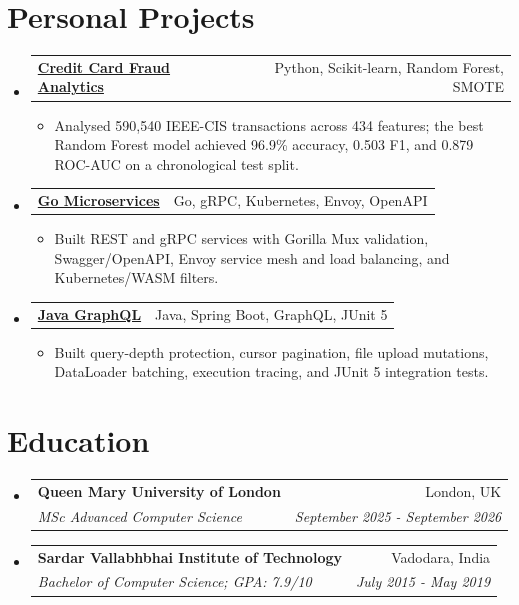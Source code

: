 \documentclass[a4paper,10pt]{article}
\makeatletter
\newcommand{\resumeItem}[1]{\item {\small #1}}
\newcommand{\resumeSubheading}[4]{
  \item
  \begin{tabular*}{1.0\textwidth}[t]{l@{\extracolsep{\fill}}r}
    \textbf{#1} & {\small #2} \\
    \textit{\small #3} & \textit{\small #4} \\
  \end{tabular*}\vspace{-4pt}
}
\newcommand{\resumeProjectHeading}[2]{
  \item
  \begin{tabular*}{1.0\textwidth}[t]{l@{\extracolsep{\fill}}r}
    \textbf{#1} & {\small #2} \\
  \end{tabular*}\vspace{-6pt}
}
\newcommand{\resumeSubHeadingListStart}{\begin{itemize}[leftmargin=0in,label={}]}
\newcommand{\resumeSubHeadingListEnd}{\end{itemize}}
\newcommand{\resumeItemListStart}{\begin{itemize}}
\newcommand{\resumeItemListEnd}{\end{itemize}\vspace{-2pt}}
\makeatother
\begin{document}
\section{Personal Projects}
\resumeSubHeadingListStart
    \resumeProjectHeading
      {\href{https://github.com/aymanapatel/qmul-all-projects/blob/main/data-analytics/coursework1/credit-card-report.pdf}{Credit Card Fraud Analytics}}{Python, Scikit-learn, Random Forest, SMOTE}
      \resumeItemListStart
        \resumeItem{Analysed 590,540 IEEE-CIS transactions across 434 features; the best Random Forest model achieved 96.9\% accuracy, 0.503 F1, and 0.879 ROC-AUC on a chronological test split.}
      \resumeItemListEnd

    \resumeProjectHeading
      {\href{https://github.com/aymanapatel/golang-microservices}{Go Microservices}}{Go, gRPC, Kubernetes, Envoy, OpenAPI}
      \resumeItemListStart
        \resumeItem{Built REST and gRPC services with Gorilla Mux validation, Swagger/OpenAPI, Envoy service mesh and load balancing, and Kubernetes/WASM filters.}
      \resumeItemListEnd

    \resumeProjectHeading
      {\href{https://github.com/aymanapatel/java-graphql}{Java GraphQL}}{Java, Spring Boot, GraphQL, JUnit 5}
      \resumeItemListStart
        \resumeItem{Built query-depth protection, cursor pagination, file upload mutations, DataLoader batching, execution tracing, and JUnit 5 integration tests.}
      \resumeItemListEnd
\resumeSubHeadingListEnd

\section{Education}
\resumeSubHeadingListStart
  \resumeSubheading
    {Queen Mary University of London}{London, UK}
    {MSc Advanced Computer Science}{September 2025 - September 2026}
  \resumeSubheading
    {Sardar Vallabhbhai Institute of Technology}{Vadodara, India}
    {Bachelor of Computer Science; GPA: 7.9/10}{July 2015 - May 2019}
\resumeSubHeadingListEnd
\end{document}
